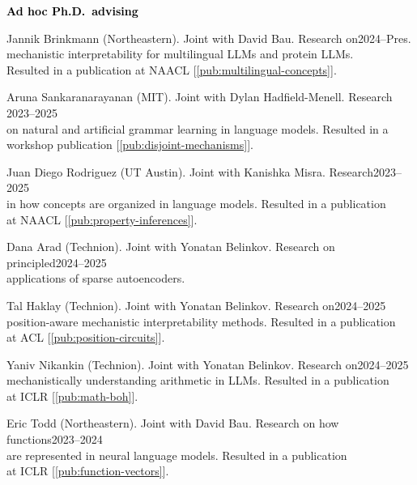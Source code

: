 \documentclass[10pt]{article}
\renewcommand{\subsection}[1]{\textcolor{black}{#1}}
\newcommand{\halfblankline}{\quad\vspace{-0.5\baselineskip}\pagebreak[3]}
\begin{document}
	\halfblankline

	\subsection{\textbf{Ad hoc Ph.D.\ advising}}
	\begin{innerlist}
	\item Jannik Brinkmann (Northeastern). Joint with David Bau. Research on\hfill 2024--Pres.\\
	      mechanistic interpretability for multilingual LLMs and protein LLMs.\\Resulted
		  in a publication at NAACL [\ref{pub:multilingual-concepts}].
	\item Aruna Sankaranarayanan (MIT). Joint with Dylan Hadfield-Menell. Research \hfill 2023--2025\\
	on natural and artificial grammar learning in language models. Resulted in a\\workshop publication [\ref{pub:disjoint-mechanisms}].
	\item Juan Diego Rodriguez (UT Austin). Joint with Kanishka Misra. Research\hfill 2023--2025\\
	in how concepts are organized in language models. Resulted in a publication\\at NAACL [\ref{pub:property-inferences}].
	\item Dana Arad (Technion). Joint with Yonatan Belinkov. Research on principled\hfill 2024--2025\\applications of sparse autoencoders.
	\item Tal Haklay (Technion). Joint with Yonatan Belinkov. Research on\hfill 2024--2025\\position-aware mechanistic interpretability methods.
	      Resulted in a publication\\at ACL [\ref{pub:position-circuits}].
	\item Yaniv Nikankin (Technion). Joint with Yonatan Belinkov. Research on\hfill 2024--2025\\mechanistically understanding arithmetic in LLMs.
	      Resulted in a publication\\at ICLR [\ref{pub:math-boh}].
	\item Eric Todd (Northeastern). Joint with David Bau. Research on how functions\hfill 2023--2024\\are
		  represented in neural language models. Resulted in a publication\\at ICLR [\ref{pub:function-vectors}].
	\end{innerlist}
\end{document}
